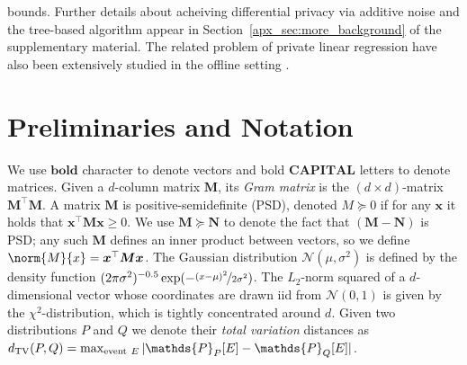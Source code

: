 \documentclass{article}
\newcommand{\os}[1]{\textcolor{red}{Or's comment:~\textbf{#1}}}
\renewcommand{\vec}[1]{\bm{#1}}
\renewcommand{\Pr}{\mathds{P}}
\providecommand\transp{\top}
\let\transpsymbol\transp
\renewcommand{\transp}[1]{#1^\transpsymbol}
\newcommand{\Normal}{\mathcal{N}}
\begin{document}
bounds. Further details about acheiving differential privacy via additive noise and the tree-based algorithm appear in Section~\ref{apx_sec:more_background} of the supplementary material.
%
The related problem of private linear regression have also been extensively studied in the offline setting
\citep{ChaudhuriDPERM2011,BassilyPrivateEmpiricalRisk2014}.

\section{Preliminaries and Notation}
\label{sec:preliminaries}

We use $\vec{bold}$ character to denote vectors and bold
$\vec{CAPITAL}$ letters to denote matrices.  Given a $d$-column matrix
$\vec M$, its \emph{Gram matrix} is the $(d\times d)$-matrix
$\transp{\vec M}\vec M$.  A matrix $\vec M$ is positive-semidefinite
(PSD), denoted $M\succeq 0$ if for any $\vec x$ it holds that
$\transp{\vec x} \vec M \vec x \geq 0$.  We use $\vec M\succeq \vec N$
to denote the fact that $(\vec M-\vec N)$ is PSD; any such $\vec M$
defines an inner product between vectors, so we define
$\norm{M}{x} = \transp{\vec x} \vec M \vec x$.  The
Gaussian distribution $\Normal(\mu,\sigma^2)$ is defined by the density
function
$(2\pi\sigma^2)^{-0.5}\exp(-\nicefrac{(x-\mu)^2}{2\sigma^2})$. The
$L_2$-norm squared of a $d$-dimensional vector whose coordinates are
drawn iid from $\Normal(0,1)$ is given by the $\chi^2$-distribution,
which is tightly concentrated around $d$. Given two distributions $P$
and $Q$ we denote their \emph{total variation} distances as
$d_{\rm TV}(P,Q) = \max_{{\rm
    event}~E}|\Pr_P[E]-\Pr_Q[E]|$.  %
\end{document}
